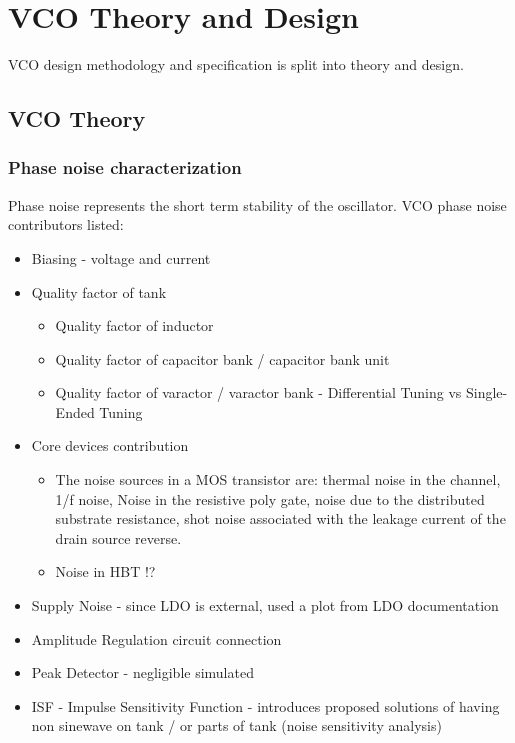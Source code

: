 \section{VCO Theory and Design}

VCO design methodology and specification is split into theory and design.


\subsection{VCO Theory}


\subsubsection*{Phase noise characterization}

Phase noise represents the short term stability of the oscillator. VCO phase noise contributors listed:

\begin{itemize}
	\item Biasing - voltage and current %
	\item Quality factor of tank %
	\begin{itemize}
		\item Quality factor of inductor
		\item Quality factor of capacitor bank / capacitor bank unit %
		\item Quality factor of varactor / varactor bank - Differential Tuning vs Single-Ended Tuning 
	\end{itemize}
	\item Core devices contribution 
	\begin{itemize}
		\item The noise sources in a MOS transistor are: thermal noise in the channel, 1/f noise, Noise in the resistive poly gate, noise due to the distributed substrate resistance, shot noise associated with the leakage current of the drain source reverse.
		\item Noise in HBT !?
	\end{itemize}
	\item Supply Noise - since LDO is external, used a plot from LDO documentation 
	\item Amplitude Regulation circuit connection
	\item Peak Detector - negligible simulated 
	\item ISF - Impulse Sensitivity Function - introduces proposed solutions of having non sinewave on tank / or parts of tank (noise sensitivity analysis)
\end{itemize}

